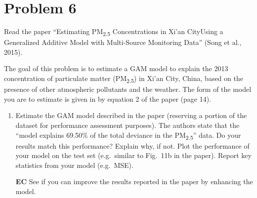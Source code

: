 \documentclass[11pt,twoside]{article}
\newcommand{\pts}[1]{\marginpar{ \small\hspace{0pt} \textit{[#1]} } }
\newcommand{\?}{\stackrel{?}{=}}
\newcommand{\la}{\lambda}
\begin{document}




\section*{Problem 6 }
Read the paper ``Estimating PM\textsubscript{2.5} Concentrations in Xi'an CityUsing a Generalized Additive Model with Multi-Source
Monitoring Data'' (Song et al., 2015).

The goal of this problem is to estimate a GAM model to explain the 2013 concentration of particulate matter
(PM\textsubscript{2.5}) in Xi'an City, China, based on the presence of other atmospheric pollutants and the weather.
The form of the model you are to estimate is given in by equation 2 of the paper (page 14). 

   \begin{enumerate}[\bf (a)]
   \item Estimate the GAM model described in the paper \pts{12} (reserving a portion of the dataset for performance
     assessment purposes).  The authors state that the ``model explains 69.50\% of the total deviance in the
     PM\textsubscript{2.5}'' data. Do your results match this performance? Explain why, if not.  Plot the performance of
     your model on the test set (e.g.\ similar to Fig.\ 11b in the paper). Report key statistics from your model (e.g.\
     MSE).

   \item[\bf EC] See if you can improve the results reported in the paper by enhancing the model. \pts{4}
\end{enumerate}
 
\end{document}
